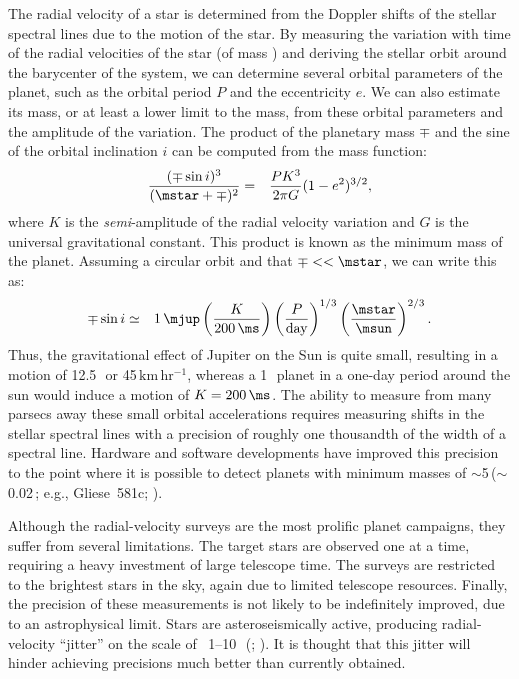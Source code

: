 The radial velocity of a star is determined from the Doppler shifts of the stellar spectral lines due to the motion of the star.
By measuring the variation with time of the radial velocities of the star (of mass \mstar) and deriving the stellar orbit around the barycenter of the system, we can determine several orbital parameters of the planet, such as the orbital period $P$
and the eccentricity $e$.
We can also estimate its mass, or at least a lower limit to the mass, from these orbital parameters and the amplitude of the variation.
The product of the planetary mass $\mp$ and the sine of the orbital inclination $i$ can be computed from the mass function:
\begin{eqnarray*}
\frac{(\mp \sin{i})^3}{(\mstar + \mp)^2} & =
& \frac{P K^3}{2 \pi G}  (1-e^2)^{3/2},
\end{eqnarray*}
where $K$ is the {\it semi}-amplitude of the radial velocity variation and $G$ is the universal gravitational constant.
This product is known as the minimum mass of the planet.
Assuming a circular orbit and that $\mp << \mstar$, we can write this as:
\begin{eqnarray}
\mp \sin{i} & \simeq & 1\,\mjup \left( \frac{K}{200\,\ms} \right)
    \left( \frac{P}{\mathrm{day}} \right)^{1/3}
    \left( \frac{\mstar}{\msun} \right)^{2/3}.\label{cha:intro:sec:methods:sub:rv:eqn:mpsini}
\end{eqnarray}
Thus, the gravitational effect of Jupiter on the Sun is quite small, resulting in a motion of     12.5\,\ms\ or 45\,$\mathrm{km\,hr^{-1}}$, whereas a 1\,\mjup\ planet in a one-day period around the sun would induce a motion of $K=200\,\ms$.
The ability to measure from many parsecs away these small orbital accelerations requires measuring shifts in the stellar spectral lines with a precision of roughly one thousandth of the width of a spectral line.
Hardware and software developments have improved this precision to the point where it is possible to detect planets with minimum masses of $\sim$5\,\mearth ($\sim$0.02\,\mjup; e.g., \mbox{Gliese 581c}; \citealp{Udry_Bonfils_Delfosse:aa:2007a}).

Although the radial-velocity surveys are the most prolific planet campaigns, they suffer from several limitations.
The target stars are observed one at a time, requiring a heavy investment of large telescope time.
The surveys are restricted to the brightest stars in the sky, again due to limited telescope resources.
Finally, the precision of these measurements is not likely to be indefinitely improved, due to an astrophysical limit.
Stars are asteroseismically active, producing radial-velocity ``jitter'' on the scale of ~1--10\,\ms\ (\citealp*{Saar_Butler_Marcy:apjl:1998a}; \citealp{Santos_Mayor_Naef:aa:2000a, Wright:pasp:2005a}).
It is thought that this jitter will hinder achieving precisions much better than currently obtained.

